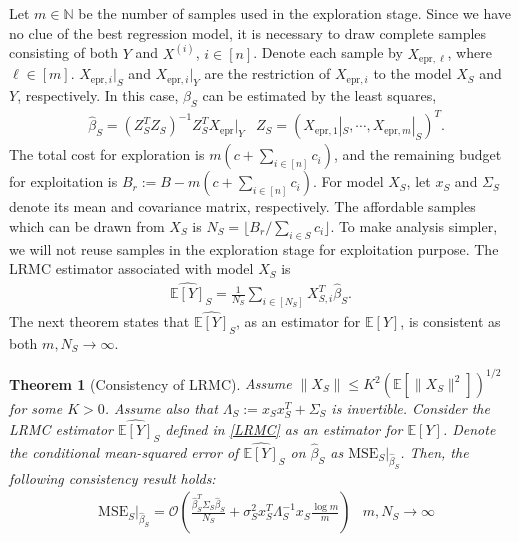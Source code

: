\documentclass[11pt,a4paper]{amsart}
\numberwithin{equation}{section}
\theoremstyle{plain}
\newtheorem{Th}{Theorem}
\theoremstyle{definition}
\def\N{{\mathbb N}}
\def\E{{\mathbb E}}
\def\ex{{\text{epr}}}
\def\mse{{\text{MSE}}}
\begin{document}
Let $m\in\N$ be the number of samples used in the exploration stage. 
Since we have no clue of the best regression model,  it is necessary to draw complete samples consisting of both $Y$ and $X^{(i)}$, $i\in [n]$. 
Denote each sample by $X_{\ex, \ell}$, where $\ell\in [m]$.
$X_{\ex,i}|_S$ and $X_{\ex,i}|_Y$ are the restriction of $X_{\ex,i}$ to the model $X_S$ and $Y$, respectively.  
In this case, $\beta_S$ can be estimated by the least squares, 
\begin{align}
&\widehat{\beta}_S= (Z_S^TZ_S)^{-1}Z_S^TX_\ex|_Y& Z_S = (X_{\ex, 1}|_S, \cdots, X_{\ex, m}|_S)^T.
\end{align} 
The total cost for exploration is $m(c+\sum_{i\in [n]}c_i)$, and the remaining budget for exploitation is $B_r:=B -m(c+\sum_{i\in [n]}c_i)$.
For model $X_S$, let $x_S$ and $\Sigma_S$ denote its mean and covariance matrix, respectively. 
The affordable samples which can be drawn from $X_S$ is $N_S = \lfloor B_r/\sum_{i\in S}c_i\rfloor$. 
To make analysis simpler, we will not reuse samples in the exploration stage for exploitation purpose.  
The LRMC estimator associated with model $X_S$ is 
\begin{align}
\widehat{\E[Y]}_S = \frac{1}{N_S}\sum_{i\in [N_S]}X_{S,i}^T\widehat{\beta}_S.\label{LRMC}
\end{align}
The next theorem states that $\widehat{\E[Y]}_S$, as an estimator for $\E[Y]$, is consistent as both $m, N_S\to\infty$. 
\begin{Th}[Consistency of LRMC]\label{thm:cons}
Assume $\|X_S\|\leq K^2(\E[\|X_S\|^2])^{1/2}$ for some $K>0$.
Assume also that $\Lambda_S := x_Sx_S^T+\Sigma_S$ is invertible. 
Consider the LRMC estimator $\widehat{\E[Y]}_S$ defined in \eqref{LRMC} as an estimator for $\E[Y]$. 
Denote the conditional mean-squared error of $\widehat{\E[Y]}_S$ on $\widehat{\beta}_S$ as $\mse_S|_{\widehat{\beta}_S}$. 
Then, the following consistency result holds:
\begin{align}
&\mse_S|_{\widehat{\beta}_S} = \mathcal O\left(\frac{\widehat{\beta}_S^T\Sigma_S\widehat{\beta}_S}{N_S}+\sigma_S^2x_S^T\Lambda_S^{-1}x_S\frac{\log m}{m}\right)&m, N_S\to\infty\label{sd}
\end{align}
\end{Th}
\end{document}
